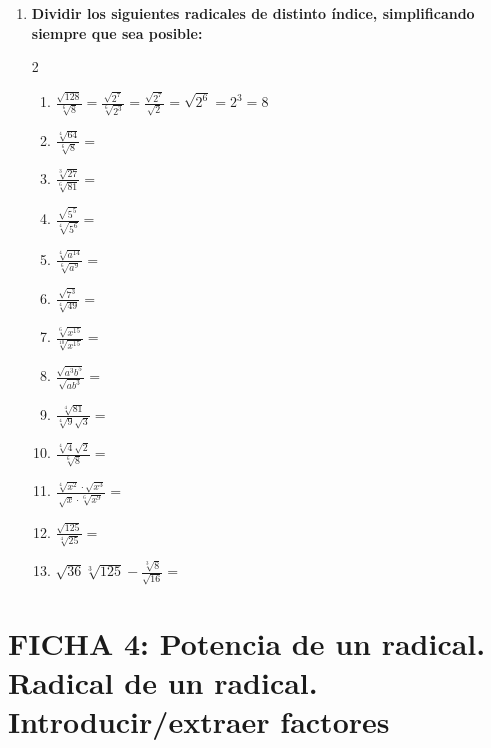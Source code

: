 \documentclass[10pt, a4paper]{article}
\begin{document}
\begin{enumerate}
    \item \textbf{Dividir los siguientes radicales de distinto índice, simplificando siempre que sea posible:}
    \begin{multicol}{2}
    \begin{enumerate}[label=\alph*)]
        \item $\frac{\sqrt{128}}{\sqrt[6]{8}} = \frac{\sqrt{2^7}}{\sqrt[6]{2^3}} = \frac{\sqrt{2^7}}{\sqrt{2}} = \sqrt{2^6} = 2^3 = 8$
        \item $\frac{\sqrt[4]{64}}{\sqrt[6]{8}} =$
        \item $\frac{\sqrt[3]{27}}{\sqrt[6]{81}} =$
        \item $\frac{\sqrt{5^5}}{\sqrt[4]{5^6}} =$
        \item $\frac{\sqrt[4]{a^{14}}}{\sqrt[6]{a^9}} =$
        \item $\frac{\sqrt{7^3}}{\sqrt[4]{49}} =$
        \item $\frac{\sqrt[6]{x^{15}}}{\sqrt[10]{x^{15}}} =$
        \item $\frac{\sqrt{a^3 b^5}}{\sqrt{a b^3}} =$
        \item $\frac{\sqrt[4]{81}}{\sqrt[4]{9}\sqrt{3}} =$
        \item $\frac{\sqrt[4]{4}\sqrt{2}}{\sqrt[6]{8}} =$
        \item $\frac{\sqrt[4]{x^2}\cdot\sqrt{x^3}}{\sqrt{x}\cdot\sqrt[6]{x^9}} =$
        \item $\frac{\sqrt{125}}{\sqrt[4]{25}} =$
        \item $\sqrt{36}\sqrt[3]{125} - \frac{\sqrt[3]{8}}{\sqrt{16}} =$
    \end{enumerate}
    \end{multicol}
\end{enumerate}

\newpage

\section*{FICHA 4: Potencia de un radical. Radical de un radical. Introducir/extraer factores}
\end{document}
